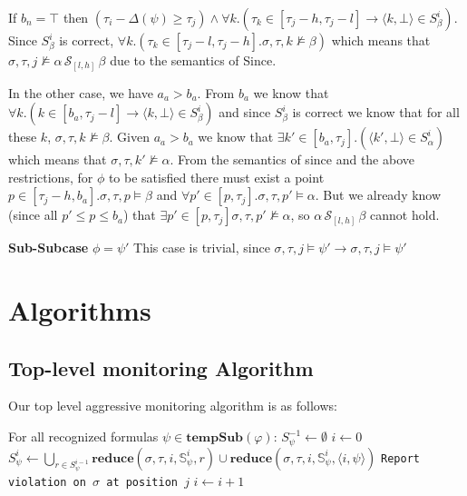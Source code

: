 \documentclass[10pt,a4paper]{article}
\newcommand{\rp}[2]{\ensuremath{\langle #1, #2 \rangle}}
\begin{document}
If $b_n = \top$ then $(\tau_i-\Delta(\psi) \geq \tau_j) \wedge \forall k.(\tau_k \in [\tau_j-h,\tau_j-l] \rightarrow \rp{k}{\bot} \in S^i_\beta)$. Since $S^i_\beta$ is correct, $\forall k.(\tau_k \in [\tau_j-l,\tau_j-h]. \sigma, \tau, k \nvDash \beta)$ which means that $\sigma, \tau, j \nvDash \alpha\, \mathcal{S}_{[l,h]}\, \beta$ due to the semantics of Since.

In the other case, we have $a_a > b_a$. From $b_a$ we know that $\forall k.(k \in [b_a,\tau_j-l] \rightarrow \rp{k}{\bot} \in S^i_\beta)$ and since $S^i_\beta$ is correct we know that for all these $k$, $\sigma,\tau,k \nvDash \beta$. 
Given $a_a > b_a$ we know that $\exists k' \in [b_a,\tau_j].(\rp{k'}{\bot} \in S^i_\alpha)$ which means that $\sigma, \tau, k' \nvDash \alpha$. 
From the semantics of since and the above restrictions, for $\phi$ to be satisfied there must exist a point $p \in [\tau_j-h,b_a]. \sigma, \tau, p \vDash \beta$ and $\forall p' \in [p, \tau_j]. \sigma, \tau, p' \vDash \alpha$. 
But we already know (since all $p' \leq p \leq b_a$) that $\exists p' \in [p,\tau_j] \sigma, \tau, p' \nvDash \alpha$, so $\alpha\, \mathcal{S}_{[l,h]}\, \beta$ cannot hold.

\hspace{2em} \textbf{Sub-Subcase} $\phi = \psi'$
This case is trivial, since $\sigma,\tau,j\vDash \psi' \rightarrow \sigma,\tau,j\vDash \psi'$

\pagebreak
\section{Algorithms}
\subsection{Top-level monitoring Algorithm}
Our top level aggressive monitoring algorithm is as follows:

\begin{algorithmic}[1]
\STATE For all recognized formulas $\psi \in \mathbf{tempSub}(\varphi)$: $S^{-1}_{\psi} \leftarrow \emptyset$
\STATE $i \leftarrow 0$
\LOOP
{}
	\STATE $S^i_{\psi} \leftarrow \bigcup\limits_{r \in S^{i-1}_{\psi}} \mathbf{reduce}(\sigma, \tau, i, \mathbb{S}^i_{\psi}, r) \cup \mathbf{reduce}(\sigma, \tau, i, \mathbb{S}^i_{\psi}, \rp{i}{\psi})$
\ENDFOR
\FOR{all $\rp{j}{\bot} \in S^i_{\varphi}$}
\STATE \texttt{Report violation on $\sigma$ at position $j$}
\ENDFOR
\STATE $i \leftarrow i + 1$
\ENDLOOP
\end{algorithmic}
\end{document}
